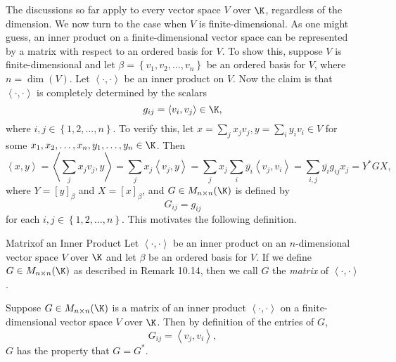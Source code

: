 \documentclass[linearalgebra]{subfiles}
\begin{document}
    \begin{remark}
        The discussions so far apply to every vector space $V$ over $\K$, regardless of the dimension. We now turn to the case when $V$ is finite-dimensional. As one might guess, an inner product on a finite-dimensional vector space can be represented by a matrix with respect to an ordered basis for $V$. To show this, suppose $V$ is finite-dimensional and let $\beta = \left\lbrace v_1,v_2,\ldots,v_n \right\rbrace$ be an ordered basis for $V$, where $n=\dim(V)$. Let $\left\langle \cdot, \cdot\right\rangle$ be an inner product on $V$. Now the claim is that $\left\langle \cdot, \cdot\right\rangle$ is completely determined by the scalars
        \begin{equation*}
            g_{ij} = \left\langle v_i, v_j\right\rangle \in\K,
        \end{equation*}
        where $i,j\in\left\lbrace 1,2,\ldots,n \right\rbrace$. To verify this, let $x=\sum^{}_{j} x_jv_j, y=\sum^{}_{i} y_iv_i\in V$ for some $x_1,x_2,\ldots,x_n,y_1,\ldots,y_n\in\K$. Then
        \begin{equation*}
            \left\langle x, y\right\rangle = \left\langle \sum^{}_{j} x_jv_j, y \right\rangle = \sum^{}_{j} x_j\left\langle v_j, y\right\rangle = \sum^{}_{j} x_j \sum^{}_{i} \overline{y_i} \left\langle v_j, v_i\right\rangle = \sum^{}_{i,j} \overline{y_i}g_{ij}x_{j} = Y^*GX,
        \end{equation*}
        where $Y = \left[ y \right] _\beta$ and $X=\left[ x \right] _\beta$, and $G\in M_{n\times n}(\K)$ is defined by
        \begin{equation*}
            G_{ij} = g_{ij}
        \end{equation*}
        for each $i,j\in\left\lbrace 1,2,\ldots,n \right\rbrace$. This motivates the following definition.
    \end{remark}

    \begin{definition}{Matrix}{of an Inner Product}
        Let $\left\langle \cdot, \cdot\right\rangle $ be an inner product on an $n$-dimensional vector space $V$ over $\K$ and let $\beta$ be an ordered basis for $V$. If we define $G\in M_{n\times n}(\K)$ as described in Remark 10.14, then we call $G$ the \emph{matrix} of $\left\langle \cdot, \cdot\right\rangle$.
    \end{definition}

    \begin{remark}
        Suppose $G\in M_{n\times n}(\K)$ is a matrix of an inner product $\left\langle \cdot, \cdot\right\rangle$ on a finite-dimensional vector space $V$ over $\K$. Then by definition of the entries of $G$,
        \begin{equation*}
            G_{ij} = \left\langle v_j, v_i\right\rangle ,
        \end{equation*}
        $G$ has the property that $G=G^*$.
    \end{remark}
\end{document}
